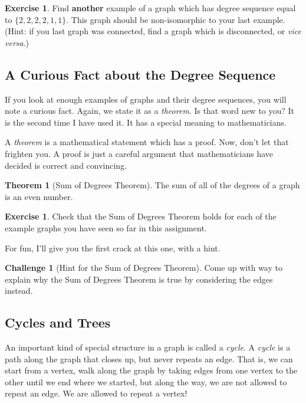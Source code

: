 \documentclass[12pt,letterpaper]{article}
\theoremstyle{definition}
\newtheorem{exercise}[question]{Exercise}
\newtheorem*{challenge}{Challenge}
\newtheorem*{theorem}{Theorem}
\begin{document}
\begin{exercise}
Find \textbf{another} example of a graph which has degree sequence equal to $\{2,2,2,2,1,1\}$. This graph should
be non-isomorphic to your last example. (Hint: if you last graph was connected, find a graph which is disconnected, 
or \textit{vice versa}.)
\end{exercise}

\subsection*{A Curious Fact about the Degree Sequence}

If you look at enough examples of graphs and their degree sequences, you will note a curious fact. Again, we state it as a \emph{theorem}. Is that word new to you? It is the second time I have used it. It has a special meaning to 
mathematicians.

A \emph{theorem} is a mathematical statement which has a proof. Now, don't let that frighten you. A proof is just
a careful argument that mathematicians have decided is correct and convincing. 

\begin{theorem}[Sum of Degrees Theorem]
The sum of all of the degrees of a graph is an even number.
\end{theorem}

\begin{exercise}
Check that the Sum of Degrees Theorem holds for each of the example graphs you have seen so far in this assignment.
\end{exercise}

For fun, I'll give you the first crack at this one, with a hint.

\begin{challenge}[Hint for the Sum of Degrees Theorem]
Come up with  way to explain why the Sum of Degrees Theorem is true by considering the edges instead.
\end{challenge}


\subsection*{Cycles and Trees}

An important kind of special structure in a graph is called a \emph{cycle}. A \emph{cycle} is a path along the graph that closes up, but never repeats an edge. That is, we can start from a vertex, walk along the graph by taking edges
from one vertex to the other until we end where we started, but along the way, we are not allowed to repeat an edge. We are allowed to repeat a vertex!
\end{document}
